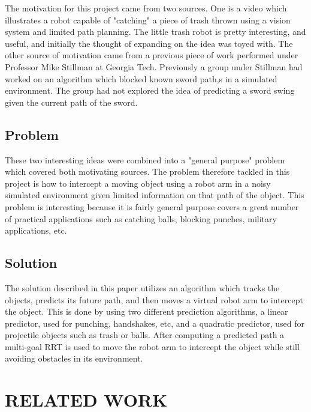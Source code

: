 \documentclass[letterpaper, 10 pt, conference]{ieeeconf}  %
\begin{document}
The motivation for this project came from two sources. One is a video which
illustrates a robot capable of "catching" a piece of trash thrown using a
vision system and limited path planning. The little trash robot is pretty
interesting, and useful, and initially the thought of expanding on the idea was
toyed with. The other source of motivation came from a previous piece of work
performed under Professor Mike Stillman at Georgia Tech. Previously a group
under Stillman had worked on an algorithm which blocked known sword path,s in a
simulated environment. The group had not explored the idea of predicting a
sword swing given the current path of the sword.

\subsection{Problem}

These two interesting ideas were combined into a "general purpose" problem
which covered both motivating sources. The problem therefore tackled in this
project is how to intercept a moving object using a robot arm in a noisy
simulated environment given limited information on that path of the object.
This problem is interesting because it is fairly general purpose covers a great
number of practical applications such as catching balls, blocking punches,
military applications, etc.

\subsection{Solution}

The solution described in this paper utilizes an algorithm which tracks the
objects, predicts its future path, and then moves a virtual robot arm to
intercept the object. This is done by using two different prediction
algorithms, a linear predictor, used for punching, handshakes, etc, and a
quadratic predictor, used for projectile objects such as trash or balls. After
computing a predicted path a multi-goal RRT is used to move the robot arm to
intercept the object while still avoiding obstacles in its environment.



\section{RELATED WORK}
\end{document}
